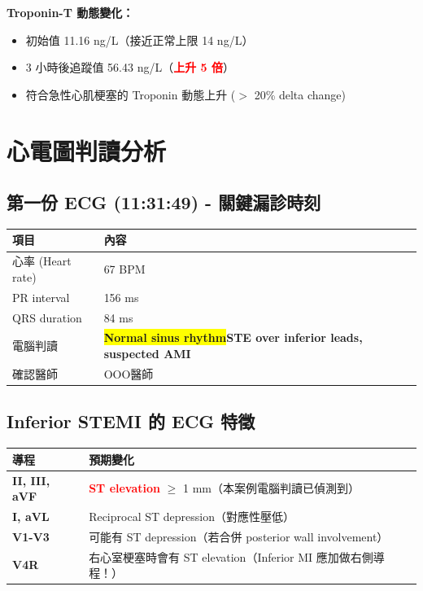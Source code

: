 \documentclass[12pt,a4paper]{article}
\begin{document}
\begin{keypoint}
\textbf{Troponin-T 動態變化：}
\begin{itemize}[noitemsep]
\item 初始值 11.16 ng/L（接近正常上限 14 ng/L）
\item 3 小時後追蹤值 56.43 ng/L（\textcolor{red}{\textbf{上升 5 倍}}）
\item 符合急性心肌梗塞的 Troponin 動態上升 ($>$ 20\% delta change)
\end{itemize}
\end{keypoint}

\newpage
\section{心電圖判讀分析}

\subsection{第一份 ECG (11:31:49) - 關鍵漏診時刻}

\begin{longtable}{p{4cm}p{10cm}}
\toprule
\textbf{項目} & \textbf{內容} \\
\midrule
\endhead
心率 (Heart rate) & 67 BPM \\
PR interval & 156 ms \\
QRS duration & 84 ms \\
電腦判讀 & \colorbox{yellow}{\textbf{Normal sinus rhythm}}\newline\colorbox{red!30}{\textbf{STE over inferior leads, suspected AMI}} \\
確認醫師 & OOO醫師 \\
\bottomrule
\end{longtable}

\subsection{Inferior STEMI 的 ECG 特徵}

\begin{longtable}{p{4cm}p{10cm}}
\toprule
\textbf{導程} & \textbf{預期變化} \\
\midrule
\endhead
\textbf{II, III, aVF} & \textcolor{red}{\textbf{ST elevation}} $\geq$ 1 mm\newline（本案例電腦判讀已偵測到） \\
\midrule
\textbf{I, aVL} & Reciprocal ST depression（對應性壓低） \\
\midrule
\textbf{V1-V3} & 可能有 ST depression（若合併 posterior wall involvement） \\
\midrule
\textbf{V4R} & 右心室梗塞時會有 ST elevation\newline\textcolor{emergency_blue}{（Inferior MI 應加做右側導程！）} \\
\bottomrule
\end{longtable}
\end{document}
